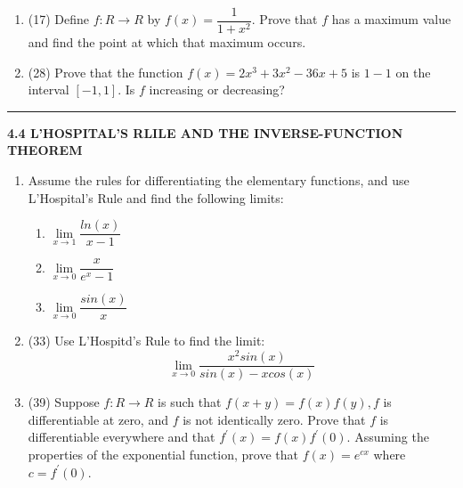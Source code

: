 \documentclass[fleqn]{article}
\begin{document}
\begin{enumerate}
    \item (17) Define $f: R \longrightarrow R$ by $f(x)=\dfrac{1}{1+x^2}$. Prove that $f$ has a maximum value and find the
    point at which that maximum occurs.



    \item (28) Prove that the function $f(x)=2x^3+3x^2-36x+5$ is $1-1$ on the interval $[-1,1]$. Is $f$ increasing or decreasing?



  \end{enumerate}

  \rule{15cm}{1pt}

  \textbf{4.4 L'HOSPITAL'S RLILE AND THE INVERSE-FUNCTION THEOREM}
  \begin{enumerate}
    \item Assume the rules for differentiating the elementary functions, and use L'Hospital's Rule
    and find the following limits: 
    \begin{enumerate}
      \item $\lim\limits_{x \to 1} \dfrac{ln(x)}{x-1}$



      \item $\lim\limits_{x \to 0} \dfrac{x}{e^x-1}$



      \item $\lim\limits_{x \to 0} \dfrac{sin(x)}{x}$



    \end{enumerate}

    \item (33) Use L'Hospitd's Rule to find the limit:
    $$
      \lim\limits_{x \to 0} \dfrac{x^2 sin(x)}{sin(x)-x cos(x)}
    $$



    \item (39) Suppose $f: R \longrightarrow R$ is such that $f(x+y)=f(x)f(y), f$ is differentiable at zero, and $f$ is
    not identically zero. Prove that $f$ is differentiable everywhere and that $f^'(x)=f(x)f^'(0)$.
    Assuming the properties of the exponential function, prove that $f(x)=e^{cx}$ where $c=f^'(0)$.



  \end{enumerate}
\end{document}
